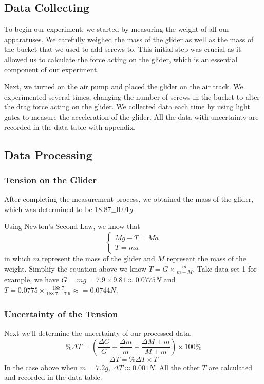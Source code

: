 \documentclass[12pt,a4paper]{article}
\begin{document}
\subsection{Data Collecting}
To begin our experiment, we started by measuring the weight of all our apparatuses. We carefully weighed the mass of the glider as well as the mass of the bucket that we used to add screws to. This initial step was crucial as it allowed us to calculate the force acting on the glider, which is an essential component of our experiment. \par
Next, we turned on the air pump and placed the glider on the air track. We experimented several times, changing the number of screws in the bucket to alter the drag force acting on the glider. We collected data each time by using light gates to measure the acceleration of the glider. All the data with uncertainty are recorded in the data table with appendix.\par
\subsection{Data Processing}
\subsubsection{Tension on the Glider}
After completing the measurement process, we obtained the mass of the glider, which was determined to be 18.87$\pm 0.01 $$g$.\par
Using Newton's Second Law, we know that
\[
    \left\{\begin{matrix} 
        Mg - T = Ma \\
        T = ma
      \end{matrix}\right. 
\]
in which $ m $ represent the mass of the glider and $ M $ represent the mass of the weight. Simplify the equation above we know $\displaystyle{T = G \times \frac{m}{m + M} }$.
Take data set 1 for example, we have $ G = mg = 7.9 \times 9.81 \approx 0.0775N $ and $ T = 0.0775 \times \displaystyle{\frac{188.7}{188.7 + 7.9}} \approx = 0.0744 N $.

\subsubsection{Uncertainty of the Tension}
Next we'll determine the uncertainty of our processed data.
\[
    \%\Delta T = (\frac{\Delta G}{G} + \frac{\Delta m}{m} + \frac{\Delta M+m}{M+m}) \times 100\% 
\]
\[
    \Delta T = \% \Delta T \times T
\]
In the case above when $ m = 7.2g $, $ \Delta T \approx 0.001 N$.
All the other $ T $ are calculated and recorded in the data table.
\end{document}
